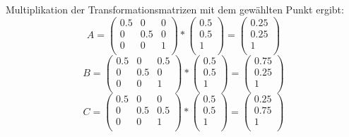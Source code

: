 \documentclass[]{article}
\begin{document}
Multiplikation der Transformationsmatrizen mit dem gewählten Punkt ergibt: 
 \[  
 A = 
 \begin{pmatrix}
 0.5 & 0 & 0 \\
 0 & 0.5 & 0 \\
 0 & 0 & 1 \\
 \end{pmatrix}
 * 
 \begin{pmatrix}
 0.5\\
 0.5\\
 1 \\
 \end{pmatrix} 
 =
 \begin{pmatrix}
 0.25\\
 0.25\\
 1 \\
 \end{pmatrix} 
    \] \[
 B = 
 \begin{pmatrix}
 0.5 & 0 & 0.5 \\
 0 & 0.5 & 0 \\
 0 & 0 & 1 \\
 \end{pmatrix}
  * 
  \begin{pmatrix}
  0.5\\
  0.5\\
  1 \\
  \end{pmatrix} 
  =
  \begin{pmatrix}
  0.75\\
  0.25\\
  1 \\
  \end{pmatrix} 
  \] \[
 C = 
 \begin{pmatrix}
 0.5 & 0 & 0 \\
 0 & 0.5 & 0.5 \\
 0 & 0 & 1 \\
 \end{pmatrix}
  * 
  \begin{pmatrix}
  0.5\\
  0.5\\
  1 \\
  \end{pmatrix} 
  =
  \begin{pmatrix}
  0.25\\
  0.75\\
  1 \\
  \end{pmatrix} 
 \] 
\end{document}
